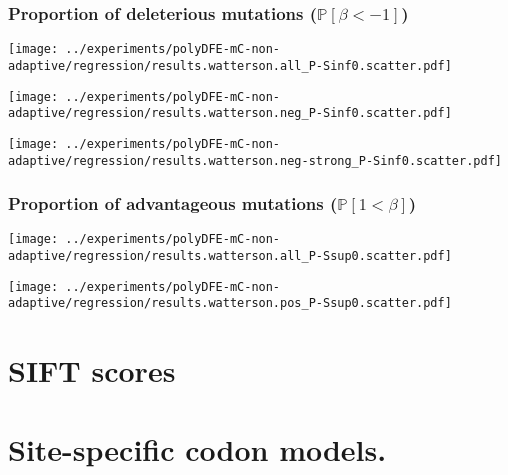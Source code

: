 \documentclass{article}
\newcommand{\proba}{\mathbb{P}}
\newcommand{\Spop}{\beta}
\newcommand{\polyDel}{\proba \left[ {\Spop < -1} \right]}
\newcommand{\polyAdv}{\proba \left[ 1 < \Spop  \right]}
\begin{document}
    \subsubsection{Proportion of deleterious mutations ($\polyDel$)}
    \begin{minipage}{0.32\linewidth}
        \texttt{[image: ../experiments/polyDFE-mC-non-adaptive/regression/results.watterson.all\_P-Sinf0.scatter.pdf]}
    \end{minipage}
    \begin{minipage}{0.32\linewidth}
        \texttt{[image: ../experiments/polyDFE-mC-non-adaptive/regression/results.watterson.neg\_P-Sinf0.scatter.pdf]}
    \end{minipage}
    \begin{minipage}{0.32\linewidth}
        \texttt{[image: ../experiments/polyDFE-mC-non-adaptive/regression/results.watterson.neg-strong\_P-Sinf0.scatter.pdf]}
    \end{minipage}

    \subsubsection{Proportion of advantageous mutations ($\polyAdv$)}
    \begin{minipage}{0.32\linewidth}
        \texttt{[image: ../experiments/polyDFE-mC-non-adaptive/regression/results.watterson.all\_P-Ssup0.scatter.pdf]}
    \end{minipage}
    \begin{minipage}{0.32\linewidth}
        \texttt{[image: ../experiments/polyDFE-mC-non-adaptive/regression/results.watterson.pos\_P-Ssup0.scatter.pdf]}
    \end{minipage}

    


    \section{SIFT scores}
    


    \section{Site-specific codon models.}
    
\end{document}
